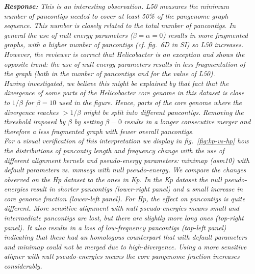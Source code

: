 \documentclass[aps,rmp,onecolumn]{revtex4-1}
\newcommand{\response}[1]{{\it {\color{response}\textbf{Response:} #1}}\vskip 5mm}
\newcommand{\SIfigBenchmark}{6}
\begin{document}
\response{This is an interesting observation. L50 measures the minimum number of pancontigs needed to cover at least 50\% of the pangenome graph sequence. 
This number is closely related to the total number of pancontigs. 
In general the use of null energy parameters ($\beta=\alpha=0$) results in more fragmented graphs, with a higher number of pancontigs (cf. fig.~{\SIfigBenchmark}D in SI) so L50 increases. 
However, the reviewer is correct that \textit{Helicobacter} is an exception and shows the opposite trend: the use of null energy parameters results in less fragmentation of the graph (both in the number of pancontigs and for the value of L50).\\
Having investigated, we believe this might be explained by that fact that the divergence of some parts of the \textit{Helicobacter} core genome in this dataset is close to $1/\beta$ for $\beta=10$ used in the figure.
Hence, parts of the core genome where the divergence reaches $>1/\beta$ might be split into different pancontigs. 
Removing the threshold imposed by $\beta$ by setting $\beta=0$ results in a longer consecutive merger and therefore a less fragmented graph with fewer overall pancontigs.\\
For a visual verification of this interpretation we display in fig.~\ref{fig:kp-vs-hp} how the distributions of pancontig length and frequency change with the use of different alignment kernels and pseudo-energy parameters: minimap (asm10) with default parameters vs. mmseqs with null pseudo-energy. We compare the changes observed on the Hp dataset to the ones in Kp. 
In the Kp dataset the null pseudo-energies result in shorter pancontigs (lower-right panel) and a small increase in core genome fraction (lower-left panel). 
For Hp, the effect on pancontigs is quite different. More sensitive alignment with null pseudo-energies means small and intermediate pancontigs are lost, but there are slightly more long ones (top-right panel). 
It also results in a loss of low-frequency pancontigs (top-left panel) indicating that these had an homologous counterpart that with default parameters and minimap could not be merged due to high-divergence. Using a more sensitive aligner with null pseudo-energies means the core pangenome fraction increases considerably.  
}
\end{document}
